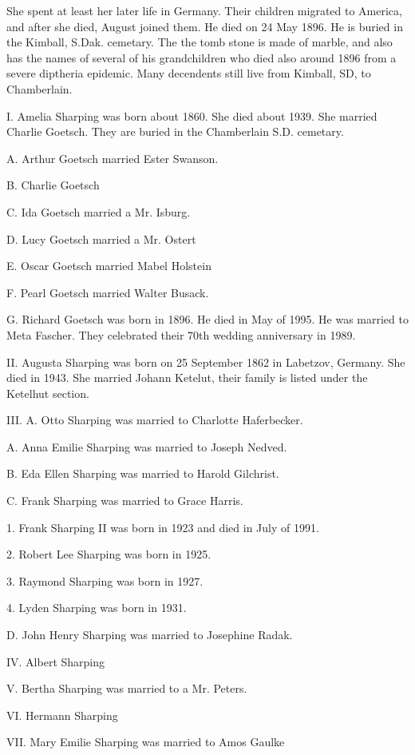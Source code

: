 \documentclass[a4paper]{article}
\begin{document}
She spent at least  her later life in Germany.  Their children migrated to America, and after she died, August joined them.  He died on 24 May 1896.  He is buried in the Kimball, S.Dak. cemetary.  The the tomb stone is made of marble, and also has the names of several of his grandchildren who died also around 1896 from a severe diptheria epidemic.  Many decendents still live from Kimball, SD, to Chamberlain.

I. Amelia Sharping was born about 1860.  She died about 1939.  She married  Charlie Goetsch.  They are buried in the Chamberlain S.D. cemetary.  

A. Arthur Goetsch married Ester Swanson.

B. Charlie Goetsch

C. Ida Goetsch married a Mr. Isburg.

D. Lucy Goetsch married a Mr. Ostert

E. Oscar Goetsch married  Mabel Holstein

F. Pearl Goetsch married Walter Busack.

G. Richard Goetsch was born in 1896.  He died in May of 1995.  He was married to Meta Fascher.  They celebrated their 70th wedding anniversary in 1989. 

II. Augusta Sharping was born on 25 September 1862 in Labetzov, Germany.  She died in 1943.  She married Johann Ketelut, their family is listed under the Ketelhut section.

III. A. Otto  Sharping was married to Charlotte Haferbecker.

A. Anna Emilie Sharping was married to Joseph Nedved.

B. Eda Ellen Sharping was married to Harold Gilchrist.  

C. Frank Sharping was married to Grace Harris.

1. Frank Sharping II was born in 1923 and died in July of 1991.

2. Robert Lee Sharping was born in 1925.

3. Raymond Sharping was born in 1927.

4. Lyden Sharping was born in 1931.

D. John Henry Sharping was married to Josephine Radak.

IV. Albert Sharping

V. Bertha Sharping was married to a Mr. Peters.

VI. Hermann Sharping

VII. Mary Emilie Sharping was married to Amos Gaulke
\end{document}
